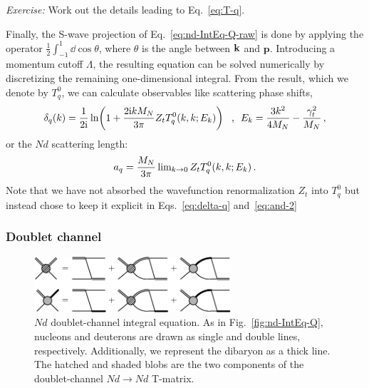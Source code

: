 \begin{prob}
\emph{Exercise:} Work out the details leading to Eq.~\eqref{eq:T-q}.
\end{prob}

Finally, the S-wave projection of Eq.~\eqref{eq:nd-IntEq-Q-raw} is done by 
applying the operator $\frac12\int_{-1}^{1}\dd\cos\theta$, where $\theta$ is 
the angle between $\mathbf{k}$ and ${\mathbf{p}}$.  Introducing a momentum cutoff $\Lambda$, 
the resulting equation can be solved numerically by discretizing the 
remaining one-dimensional integral.  From the result, which we denote by 
$T_q^0$, we can calculate observables like scattering phase shifts,
%
\begin{equation}
 \delta_{q}(k) = \frac{1}{2\ii}
 \ln\!\left(1+\frac{2\ii k\MN}{3\pi} Z_t T_q^0(k,k;E_k)\right)
 \mathtext{,} E_k = \frac{3k^2}{4\MN}-\frac{\gamt^2}{\MN} \,,
\label{eq:delta-q}
\end{equation}
%
or the $Nd$ scattering length:
%
\begin{equation}
 a_q = \frac{\MN}{3\pi}\lim\nolimits_{k\to0} Z_t T_q^0(k,k;E_k) \,.
\label{eq:and-2}
\end{equation}
%
Note that we have not absorbed the wavefunction renormalization $Z_t$ into 
$T_q^0$ but instead chose to keep it explicit in Eqs.~\eqref{eq:delta-q} 
and~\eqref{eq:and-2}

\subsubsection{Doublet channel}
\label{sec:EFT-NdDoublet}

\begin{figure}[htbp]
\centering
\includegraphics[clip,width=0.65\textwidth]{nd-IntEq-D}
\caption{$Nd$ doublet-channel integral equation.  As in 
Fig.~\ref{fig:nd-IntEq-Q}, nucleons and deuterons are drawn as single and 
double lines, respectively.  Additionally, we represent the \OneSNot dibaryon 
as a thick line.  The hatched and shaded blobs are the two components of the 
doublet-channel $Nd \to Nd$ T-matrix.}
\label{fig:nd-IntEq-D}
\end{figure}

